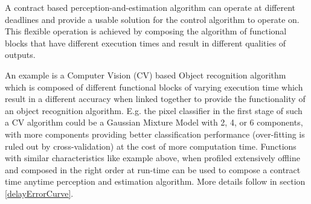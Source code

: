 A contract based perception-and-estimation algorithm can operate at different deadlines and provide a usable solution for the control algorithm to operate on. This flexible operation is achieved by composing the algorithm of functional blocks that have different execution times and result in different qualities of outputs. 


An example is a Computer Vision (CV) based Object recognition algorithm which is composed of different functional blocks of varying execution time which result in a different accuracy when linked together to provide the functionality of an object recognition algorithm. E.g. the pixel classifier in the first stage of such a CV algorithm could be a Gaussian Mixture Model with 2, 4, or 6 components, with more components providing better classification performance (over-fitting is ruled out by cross-validation) at the cost of more computation time. Functions with similar characteristics like example above, when profiled extensively offline and composed in the right order at run-time can be used to compose a contract time anytime perception and estimation algorithm. More details follow in section \ref{delayErrorCurve}.







